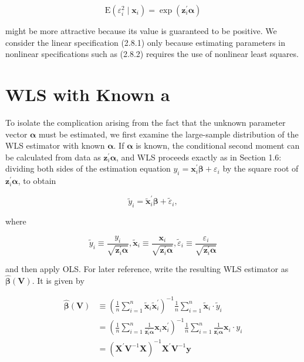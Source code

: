 \documentclass[10pt]{article}
\begin{document}
\begin{equation*}
\mathrm{E}\left(\varepsilon_{i}^{2} \mid \mathbf{x}_{i}\right)=\exp \left(\mathbf{z}_{i}^{\prime} \boldsymbol{\alpha}\right) \tag{2.8.2}
\end{equation*}


might be more attractive because its value is guaranteed to be positive. We consider the linear specification (2.8.1) only because estimating parameters in nonlinear specifications such as (2.8.2) requires the use of nonlinear least squares.

\section*{WLS with Known a}
To isolate the complication arising from the fact that the unknown parameter vector $\boldsymbol{\alpha}$ must be estimated, we first examine the large-sample distribution of the WLS estimator with known $\boldsymbol{\alpha}$. If $\boldsymbol{\alpha}$ is known, the conditional second moment can be calculated from data as $\mathbf{z}_{i}^{\prime} \boldsymbol{\alpha}$, and WLS proceeds exactly as in Section 1.6: dividing both sides of the estimation equation $y_{i}=\mathbf{x}_{i}^{\prime} \boldsymbol{\beta}+\varepsilon_{i}$ by the square root of $\mathbf{z}_{i}^{\prime} \boldsymbol{\alpha}$, to obtain


\begin{equation*}
\tilde{y}_{i}=\tilde{\mathbf{x}}_{i}^{\prime} \boldsymbol{\beta}+\tilde{\varepsilon}_{i}, \tag{2.8.3}
\end{equation*}


where

$$
\tilde{y}_{i} \equiv \frac{y_{i}}{\sqrt{\mathbf{z}_{i}^{\prime} \boldsymbol{\alpha}}}, \tilde{\mathbf{x}}_{i} \equiv \frac{\mathbf{x}_{i}}{\sqrt{\mathbf{z}_{i}^{\prime} \boldsymbol{\alpha}}}, \tilde{\varepsilon}_{i} \equiv \frac{\varepsilon_{i}}{\sqrt{\mathbf{z}_{i}^{\prime} \boldsymbol{\alpha}}}
$$

and then apply OLS. For later reference, write the resulting WLS estimator as $\widehat{\boldsymbol{\beta}}(\mathbf{V})$. It is given by


\begin{align*}
\widehat{\boldsymbol{\beta}}(\mathbf{V}) & \equiv\left(\frac{1}{n} \sum_{i=1}^{n} \tilde{\mathbf{x}}_{i} \tilde{\mathbf{x}}_{i}^{\prime}\right)^{-1} \frac{1}{n} \sum_{i=1}^{n} \tilde{\mathbf{x}}_{i} \cdot \tilde{y}_{i} \\
& =\left(\frac{1}{n} \sum_{i=1}^{n} \frac{1}{\mathbf{z}_{i}^{\prime} \boldsymbol{\alpha}} \mathbf{x}_{i} \mathbf{x}_{i}^{\prime}\right)^{-1} \frac{1}{n} \sum_{i=1}^{n} \frac{1}{\mathbf{z}_{i}^{\prime} \boldsymbol{\alpha}} \mathbf{x}_{i} \cdot y_{i} \\
& =\left(\mathbf{X}^{\prime} \mathbf{V}^{-1} \mathbf{X}\right)^{-1} \mathbf{X}^{\prime} \mathbf{V}^{-1} \mathbf{y} \tag{2.8.4}
\end{align*}
\end{document}

